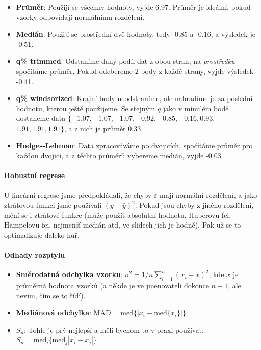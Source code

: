 \documentclass[10pt,a4paper]{article}
\begin{document}
\begin{itemize}
\item \textbf{Průměr}: Použijí se všechny hodnoty, vyjde 6.97. Průměr je ideální, pokud vzorky odpovídají normálnímu rozdělení.
\item \textbf{Medián}: Použijí se prostřední dvě hodnoty, tedy -0.85 a -0.16, a výsledek je -0.51.
\item \textbf{q\% trimmed}: Odstaníme daný podíl dat z obou stran, na \textit{prostředku} spočítáme průměr. Pokud odebereme 2 body z každé strany, vyjde výsledek -0.41.
\item \textbf{q\% windsorized}: Krajní body neodstraníme, ale nahradíme je za poslední hodnotu, kterou ještě použijeme. Se stejným $q$ jako v minulém bodě dostaneme data $\{-1.07, -1.07, -1.07, -0.92, -0.85, -0.16, 0.93,$ $1.91, 1.91, 1.91\}$, a z nich je průměr 0.33.
\item \textbf{Hodges-Lehman}: Data zpracováváme po dvojicích, spočítáme průměr pro každou dvojici, a z těchto průměrů vybereme medián, vyjde -0.03.
\end{itemize}

\paragraph{Robustní regrese} U lineární regrese jsme předpokládali, že chyby $\varepsilon$ mají normální rozdělení, a jako ztrátovou funkci jsme používali $(y-\bar{y})^2$. Pokud jsou chyby z jiného rozdělení, mění se i ztrátové funkce (může použít absolutní hodnotu, Huberovu fci, Hampelovu fci, nejmenší medián atd, ve slidech jich je hodně). Pak už se to optimalizuje daleko hůř.

\paragraph{Odhady rozptylu}
\begin{itemize}
\item \textbf{Směrodatná odchylka vzorku}: $\sigma^2 = 1/n\sum_{i=1}^n (x_i - \bar{x})^2$, kde $\bar{x}$ je průměrná hodnota vzorků (a někde je ve jmenovateli dokonce $n-1$, ale nevím, čím se to řídí).
\item \textbf{Mediánová odchylka}: $\text{MAD} = \text{med}\{|x_i - \text{med}\{x_i\}|\}$
\item $S_n$: Tohle je prý nejlepší a měli bychom to v praxi používat. $S_n = \text{med}_i \{\text{med}_j |x_i - x_j|\}$
\end{itemize}
\end{document}

